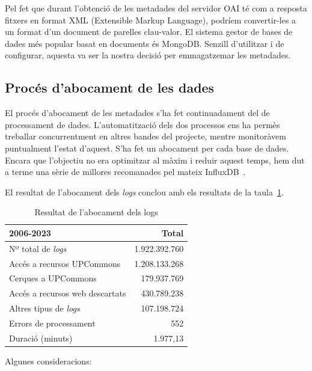 \documentclass[lettersize,journal]{IEEEtran}
\begin{document}
Pel fet que durant l'obtenció de les metadades del servidor OAI té com a resposta fitxers en format XML (Extensible Markup Language), podríem convertir-les a un format d'un document de parelles clau-valor.
El sistema gestor de bases de dades més popular basat en documents és MongoDB.
Senzill d'utilitzar i de configurar, aquesta va ser la nostra decisió per emmagatzemar les metadades.

\subsection{Procés d'abocament de les dades}\label{subsec:data-storing-process}

El procés d'abocament de les metadades s'ha fet continuadament del de processament de dades.
L'automatització dels dos processos ens ha permès treballar concurrentment en altres bandes del projecte, mentre monitoràvem puntualment l'estat d'aquest.
S'ha fet un abocament per cada base de dades.
Encara que l'objectiu no era optimitzar al màxim i reduir aquest temps, hem dut a terme una sèrie de millores recomanades pel mateix InfluxDB~\cite{influxdb:optimizations}.

El resultat de l'abocament dels \textit{logs} conclou amb els resultats de la taula~\ref{tab:table1}.

\begin{table}[!t]
    \caption{Resultat de l'abocament dels logs}\label{tab:table1}
    \centering
    \begin{tabular}{|l|r|}
        \hline
        \textbf{2006-2023} & Total\\
        \hline
        Nº total de \textit{logs}       & 1.922.392.760\\
        \hline
        Accés a recursos UPCommons      & 1.208.133.268\\
        \hline
        Cerques a UPCommons             & 179.937.769\\
        \hline
        Accés a recursos web descartats & 430.789.238\\
        \hline
        Altres tipus de \textit{logs}   & 107.198.724\\
        \hline
        Errors de processament          & 552\\
        \hline
        Duració (minuts)                & 1.977,13\\
        \hline
    \end{tabular}
\end{table}

Algunes consideracions:
\end{document}
